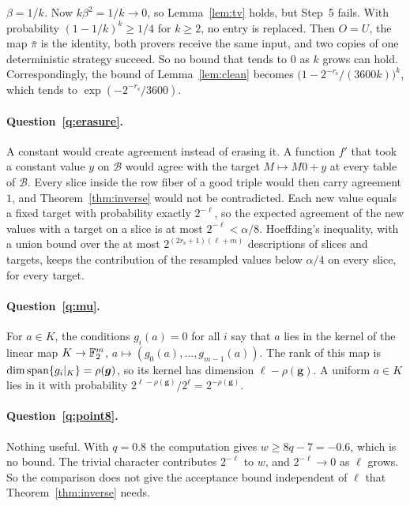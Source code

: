 \emph{$\beta=1/k$.} Now $k\beta^2=1/k\to0$, so Lemma~\ref{lem:tv} holds, but Step~5 fails. With probability $(1-1/k)^k\ge1/4$ for $k\ge2$, no entry is replaced. Then $O=U$, the map $\bar\pi$ is the identity, both provers receive the same input, and two copies of one deterministic strategy succeed. So no bound that tends to $0$ as $k$ grows can hold. Correspondingly, the bound of Lemma~\ref{lem:clean} becomes $\bigl(1-2^{-r_{\mathrm s}}/(3600k)\bigr)^k$, which tends to $\exp(-2^{-r_{\mathrm s}}/3600)$.

\paragraph{Question~\ref{q:erasure}.} A constant would create agreement instead of erasing it. A function $f'$ that took a constant value $y$ on $\mathcal B$ would agree with the target $M\mapsto M0+y$ at every table of $\mathcal B$. Every slice inside the row fiber of a good triple would then carry agreement $1$, and Theorem~\ref{thm:inverse} would not be contradicted. Each new value equals a fixed target with probability exactly $2^{-\ell}$, so the expected agreement of the new values with a target on a slice is at most $2^{-\ell}<\alpha/8$. Hoeffding's inequality, with a union bound over the at most $2^{(2r_{\mathrm s}+1)(\ell+m)}$ descriptions of slices and targets, keeps the contribution of the resampled values below $\alpha/4$ on every slice, for every target.

\paragraph{Question~\ref{q:mu}.} For $a\in K$, the conditions $g_i(a)=0$ for all $i$ say that $a$ lies in the kernel of the linear map $K\to\mathbb{F}_2^m$, $a\mapsto(g_0(a),\dots,g_{m-1}(a))$. The rank of this map is $\dim\operatorname{span}\{g_i|_K\}=\rho(\boldsymbol g)$, so its kernel has dimension $\ell-\rho(\boldsymbol g)$. A uniform $a\in K$ lies in it with probability $2^{\ell-\rho(\boldsymbol g)}/2^\ell=2^{-\rho(\boldsymbol g)}$.

\paragraph{Question~\ref{q:point8}.} Nothing useful. With $q=0.8$ the computation gives $w\ge8q-7=-0.6$, which is no bound. The trivial character contributes $2^{-\ell}$ to $w$, and $2^{-\ell}\to0$ as $\ell$ grows. So the comparison does not give the acceptance bound independent of $\ell$ that Theorem~\ref{thm:inverse} needs.

